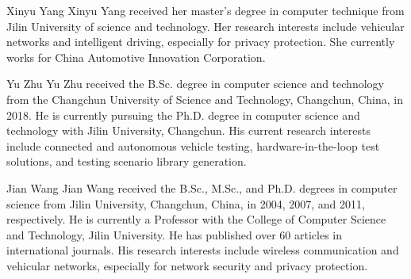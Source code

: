 \documentclass[journal]{IEEEtran}
\begin{document}
	\begin{IEEEbiography}{Xinyu Yang}
		Xinyu Yang received her master's degree in computer technique from Jilin University of science and technology. Her research interests include vehicular networks and intelligent driving, especially for privacy protection. She currently works for China Automotive Innovation Corporation.\end{IEEEbiography}
	
	\begin{IEEEbiography}{Yu Zhu}
		Yu Zhu received the B.Sc. degree in computer
		science and technology from the Changchun University
		of Science and Technology, Changchun, China,
		in 2018. He is currently pursuing the Ph.D. degree
		in computer science and technology with Jilin University,
		Changchun. His current research interests
		include connected and autonomous vehicle testing,
		hardware-in-the-loop test solutions, and testing scenario
		library generation.\end{IEEEbiography}
	
	\begin{IEEEbiography}{Jian Wang}
		Jian Wang received the B.Sc., M.Sc., and Ph.D.
		degrees in computer science from Jilin University,
		Changchun, China, in 2004, 2007, and 2011, respectively.
		He is currently a Professor with the College of
		Computer Science and Technology, Jilin University.
		He has published over 60 articles in international
		journals. His research interests include wireless communication
		and vehicular networks, especially for
		network security and privacy protection.\end{IEEEbiography}
\end{document}
